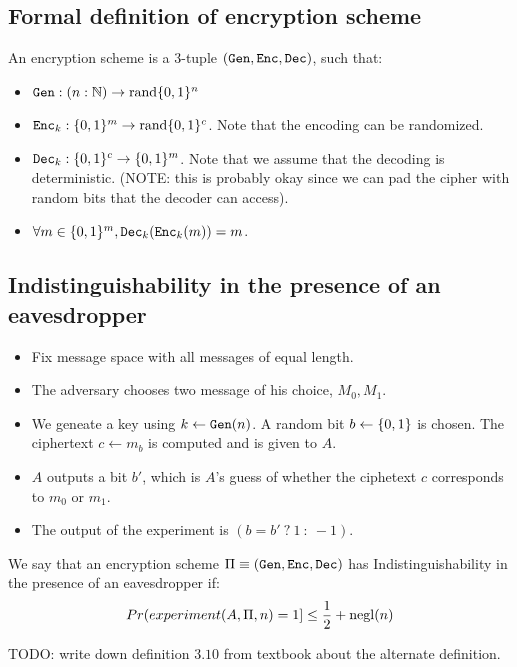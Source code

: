 \subsection{Formal definition of encryption scheme}
An encryption scheme is a 3-tuple $(\texttt{Gen}, \texttt{Enc}, \texttt{Dec})$, such that:
\begin{itemize}
\item $\texttt{Gen}: (n: \mathbb{N}) \rightarrow \operatorname{rand} \{0, 1\}^n$
\item $\texttt{Enc}_k: \{0, 1\}^m \rightarrow \operatorname{rand} \{0, 1\}^c$. Note that the encoding
    can be randomized.
\item $\texttt{Dec}_k: \{0, 1\}^c \rightarrow \{0, 1\}^m$. Note that we assume that
    the decoding is deterministic. (NOTE: this is probably okay since we
    can pad the cipher with random bits that the decoder can access).
\item $\forall m \in \{0, 1\}^m, \texttt{Dec}_k (\texttt{Enc}_k(m)) = m$.
\end{itemize}

\subsection{Indistinguishability in the presence of an eavesdropper}

\begin{itemize}
    \item Fix message space with all messages of equal length.
    \item The adversary chooses two message of his choice, $M_0, M_1$.
    \item We geneate a key using $k \leftarrow \texttt{Gen}(n)$. A random bit $b \leftarrow \{0, 1\}$
        is chosen. The ciphertext $c \leftarrow m_b$ is computed and is given to $A$.
    \item $A$ outputs a bit $b'$, which is $A$'s guess of whether the ciphetext $c$
        corresponds to $m_0$ or $m_1$.
    \item The output of the experiment is $(b = b' ~?~ 1 ~:~ -1)$.
\end{itemize}

We say that an encryption scheme $\Pi \equiv (\texttt{Gen}, \texttt{Enc}, \texttt{Dec})$ has
Indistinguishability in the presence of an eavesdropper if: 
$$Pr(experiment(A, \Pi, n) = 1] \leq \frac{1}{2} + \operatorname{negl}(n)$$


TODO: write down definition $3.10$ from textbook about the alternate
definition.
